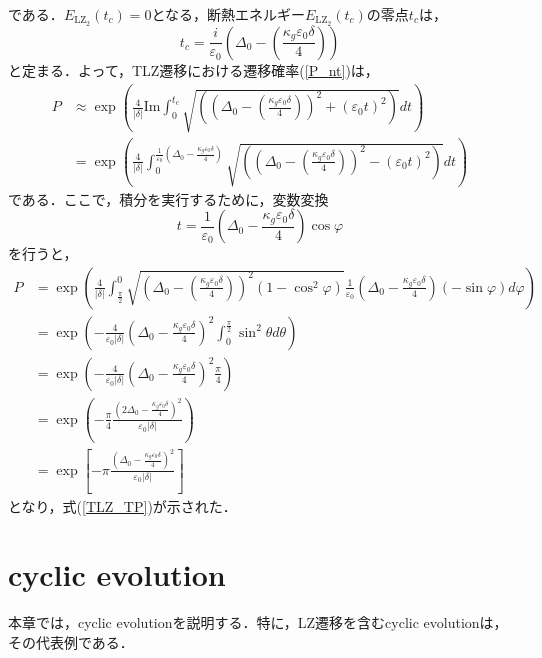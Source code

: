 \documentclass[a4paper, titlepage]{jsreport}
\begin{document}
である．$E_{\mathrm{LZ}_2}(t_c) = 0$となる，断熱エネルギー$E_{\mathrm{LZ}_2}(t_c)$の零点$t_c$は，
\begin{equation}
  t_c = \frac{i}{\varepsilon_0} \left( \Delta_0 - \left(\frac{\kappa_g \varepsilon_0 \delta}{4}\right) \right)
\end{equation}
と定まる．よって，TLZ遷移における遷移確率(\ref{P_nt})は，
\begin{align}
  P &\approx
  \exp \left(\frac{4}{|\delta|} \mathrm{Im} \int_0^{t_c} \sqrt{\left( \left( \Delta_0 - \left(\frac{\kappa_g \varepsilon_0 \delta }{4}\right) \right)^2 + (\varepsilon_0 t)^2 \right)} dt \right)\\
  &=
  \exp \left(\frac{4}{|\delta|} \int_0^{\frac{1}{\varepsilon_0} (\Delta_0 - \frac{\kappa_g \varepsilon_0 \delta}{4})} \sqrt{\left( \left( \Delta_0 - \left(\frac{\kappa_g \varepsilon_0 \delta}{4} \right)\right)^2 - (\varepsilon_0 t)^2 \right)} dt \right)
\end{align}
である．ここで，積分を実行するために，変数変換
\begin{equation}
  t = \frac{1}{\varepsilon_0} \left(\Delta_0 - \frac{\kappa_g \varepsilon_0 \delta}{4} \right) \cos \varphi
\end{equation}
を行うと，
\begin{align}
  P &=
  \exp \left(\frac{4}{|\delta|} \int_{\frac{\pi}{2}}^0 \sqrt{\left(\Delta_0 - \left(\frac{\kappa_g \varepsilon_0 \delta}{4}\right) \right)^2 (1-\cos^2\varphi)} \frac{1}{\varepsilon_0} \left( \Delta_0 - \frac{\kappa_g \varepsilon_0 \delta}{4} \right) (-\sin \varphi) d\varphi \right)\\
  &=
  \exp \left(-\frac{4}{\varepsilon_0 |\delta|} \left(\Delta_0 - \frac{\kappa_g \varepsilon_0 \delta}{4} \right) ^2\int_0^{\frac{\pi}{2}} \sin^2\theta d\theta \right)\\
  &=
  \exp \left(-\frac{4}{\varepsilon_0 |\delta|} \left(\Delta_0 - \frac{\kappa_g \varepsilon_0 \delta}{4} \right) ^2 \frac{\pi}{4} \right)\\
  &= \exp \left(-\frac{\pi}{4} \frac{(2\Delta_0-\frac{\kappa_g \varepsilon_0 \delta}{4})^2}{\varepsilon_0 |\delta|} \right)\\
  &= \exp \left[-\pi \frac{(\Delta_0 -\frac{\kappa_g \varepsilon_0 \delta}{4})^2}{\varepsilon_0 |\delta|}\right]
\end{align}
となり，式(\ref{TLZ_TP})が示された．


\chapter{cyclic evolution}\label{CE}
本章では，cyclic evolutionを説明する．特に，LZ遷移を含むcyclic evolutionは，その代表例である．
\end{document}
